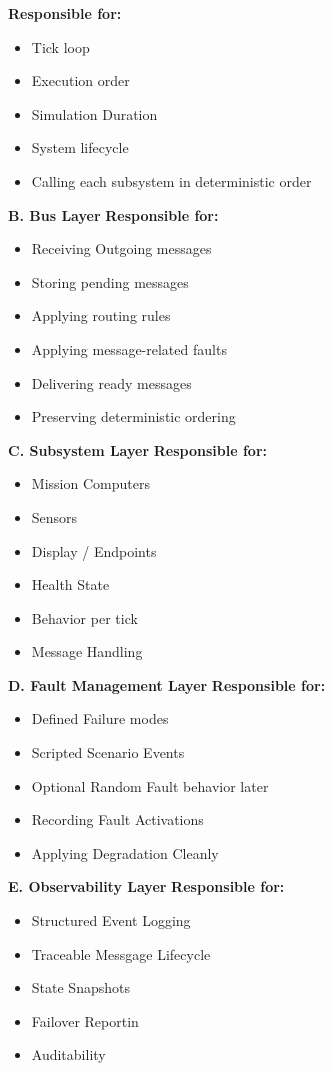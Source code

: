 \documentclass{report}
\begin{document}
\textbf{Responsible for:}
\begin{itemize}
   \item Tick loop 
   \item Execution order 
   \item Simulation Duration 
   \item System lifecycle 
   \item Calling each subsystem in deterministic order
\end{itemize}
\textbf{B. Bus Layer}
\textbf{Responsible for:}
\begin{itemize}
   \item Receiving Outgoing messages 
   \item Storing pending messages 
   \item Applying routing rules 
   \item Applying message-related faults 
   \item Delivering ready messages 
   \item Preserving deterministic ordering
\end{itemize}
\vspace{\baselineskip} \textbf{C. Subsystem Layer}
\textbf{Responsible for:}
\begin{itemize}
   \item Mission Computers 
   \item Sensors 
   \item Display / Endpoints
   \item Health State 
   \item Behavior per tick
   \item Message Handling
\end{itemize}
\vspace{\baselineskip} \textbf{D. Fault Management Layer}
\textbf{Responsible for:}
\begin{itemize}
   \item Defined Failure modes
   \item Scripted Scenario Events
   \item Optional Random Fault behavior later
   \item Recording Fault Activations
   \item Applying Degradation Cleanly
\end{itemize}
\vspace{\baselineskip} \textbf{E. Observability Layer}
\textbf{Responsible for:}
\begin{itemize}
   \item Structured Event Logging
   \item Traceable Messgage Lifecycle
   \item State Snapshots
   \item Failover Reportin
   \item Auditability
\end{itemize}
\end{document}

